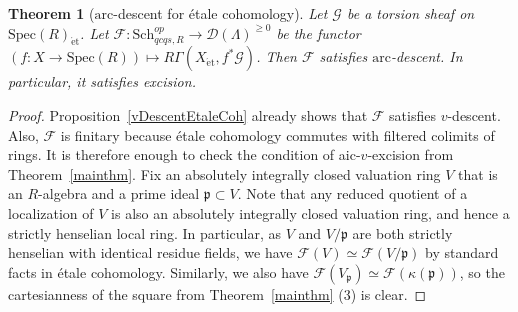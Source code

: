 \documentclass[reqno]{amsart}
\newcommand{\sF}{\mathcal{F}}
\newcommand{\et}{\mathrm{\acute{e}t}}
\newcommand{\arc}{\mathrm{arc}}
\newcommand{\D}{\mathcal{D}}
\newtheorem{theorem}{Theorem}[section]
\theoremstyle{definition}
\begin{document}
\begin{theorem}[$\arc$-descent for \'etale cohomology] 
\label{EtaleCohExcisive}
Let $\mathcal{G}$ be a torsion sheaf on $\mathrm{Spec}(R)_{\et}$. Let
$\mathcal{F}\colon  \mathrm{Sch}_{qcqs,R}^{op} \to \D( \Lambda)^{\geq 0}$ be the functor $(f\colon X \to \mathrm{Spec}(R)) \mapsto R \Gamma(X_{\et}, f^* \mathcal{G})$.
Then $\sF$ satisfies $\arc$-descent. In particular, it satisfies excision. 
\end{theorem} 
\begin{proof} 
Proposition~\ref{vDescentEtaleCoh} already shows that $\mathcal{F}$ satisfies
$v$-descent. Also, $\mathcal{F}$ is finitary because \'etale cohomology commutes
with filtered colimits of rings. It is therefore enough to check the condition
of aic-$v$-excision from Theorem~\ref{mainthm}. Fix  an absolutely integrally
closed valuation ring $V$ that is an $R$-algebra and a prime ideal $\mathfrak{p} \subset V$. Note that any reduced quotient of a localization of $V$ is also an absolutely integrally closed valuation ring, and hence a strictly henselian local ring. In particular, as $V$ and $V/\mathfrak{p}$ are both strictly henselian with identical residue fields, we have $\mathcal{F}(V) \simeq \mathcal{F}(V/\mathfrak{p})$ by standard facts in \'etale cohomology. Similarly, we also have $\mathcal{F}(V_{\mathfrak{p}}) \simeq \mathcal{F}(\kappa(\mathfrak{p}))$, so the cartesianness of the square from Theorem~\ref{mainthm} (3) is clear.
\end{proof} 
\end{document}
